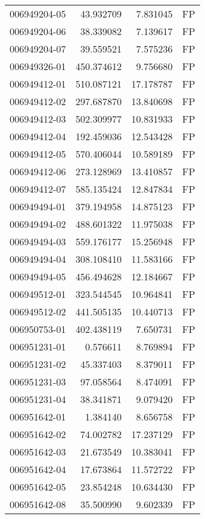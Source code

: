 \begin{tabular}{lrrl}
006949204-05 &   43.932709 &     7.831045 &   FP \\
006949204-06 &   38.339082 &     7.139617 &   FP \\
006949204-07 &   39.559521 &     7.575236 &   FP \\
006949326-01 &  450.374612 &     9.756680 &   FP \\
006949412-01 &  510.087121 &    17.178787 &   FP \\
006949412-02 &  297.687870 &    13.840698 &   FP \\
006949412-03 &  502.309977 &    10.831933 &   FP \\
006949412-04 &  192.459036 &    12.543428 &   FP \\
006949412-05 &  570.406044 &    10.589189 &   FP \\
006949412-06 &  273.128969 &    13.410857 &   FP \\
006949412-07 &  585.135424 &    12.847834 &   FP \\
006949494-01 &  379.194958 &    14.875123 &   FP \\
006949494-02 &  488.601322 &    11.975038 &   FP \\
006949494-03 &  559.176177 &    15.256948 &   FP \\
006949494-04 &  308.108410 &    11.583166 &   FP \\
006949494-05 &  456.494628 &    12.184667 &   FP \\
006949512-01 &  323.544545 &    10.964841 &   FP \\
006949512-02 &  441.505135 &    10.440713 &   FP \\
006950753-01 &  402.438119 &     7.650731 &   FP \\
006951231-01 &    0.576611 &     8.769894 &   FP \\
006951231-02 &   45.337403 &     8.379011 &   FP \\
006951231-03 &   97.058564 &     8.474091 &   FP \\
006951231-04 &   38.341871 &     9.079420 &   FP \\
006951642-01 &    1.384140 &     8.656758 &   FP \\
006951642-02 &   74.002782 &    17.237129 &   FP \\
006951642-03 &   21.673549 &    10.383041 &   FP \\
006951642-04 &   17.673864 &    11.572722 &   FP \\
006951642-05 &   23.854248 &    10.634430 &   FP \\
006951642-08 &   35.500990 &     9.602339 &   FP \\

\end{tabular}
